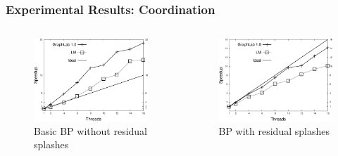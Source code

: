 \documentclass{beamer}
\begin{document}
\begin{frame}[fragile]
   \frametitle{Experimental Results: Coordination}
   \begin{columns}
      \begin{figure}[b]
         \includegraphics[width=\textwidth]{coord/speedup_bp-graphlab-400.pdf}
         \caption{Basic BP without residual splashes\newline}
      \end{figure}
      \begin{figure}[b]
         \includegraphics[width=\textwidth]{coord/speedup2_bp-graphlab-400.pdf}
         \caption{BP with residual splashes\newline\newline}

\end{figure}
\end{columns}
\end{frame}
\end{document}
